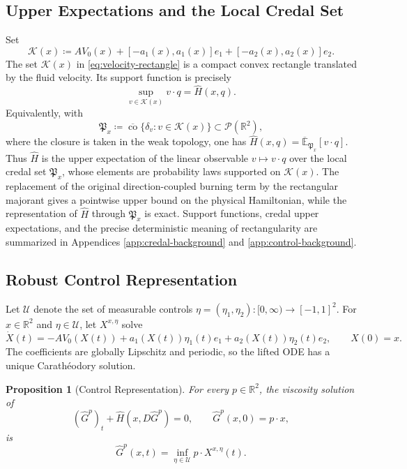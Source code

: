 \documentclass[11pt,reqno,noamsfonts]{amsart}
\newtheorem{proposition}[theorem]{Proposition}
\theoremstyle{definition}
\theoremstyle{remark}
\newcommand{\R}{\mathbb R}
\newcommand{\Pp}{\mathcal P}
\newcommand{\clco}{\overline{\operatorname{co}}}
\newcommand{\Hhat}{\widehat H}
\newcommand{\upperE}{\overline{\mathbb E}}
\begin{document}
\subsection{Upper Expectations and the Local Credal Set}
Set
\begin{equation}\label{eq:velocity-rectangle}
  \mathcal K(x)
  \coloneqq A V_0(x)
   +[-a_1(x),a_1(x)]e_1
   +[-a_2(x),a_2(x)]e_2.
\end{equation}
The set $\mathcal K(x)$ in \eqref{eq:velocity-rectangle} is a compact
convex rectangle translated by the fluid velocity.  Its support function is precisely
\[
  \sup_{v\in\mathcal K(x)}v\cdot q=\Hhat(x,q).
\]
Equivalently, with
\[
  \mathfrak P_x
  \coloneqq \clco\{\delta_v:v\in\mathcal K(x)\}
  \subset\Pp(\R^2),
\]
where the closure is taken in the weak topology, one has
  $\Hhat(x,q)
  =\upperE_{\mathfrak P_x}[v\cdot q]$.
Thus $\Hhat$ is the upper expectation of the linear observable
$v\mapsto v\cdot q$ over the local credal set $\mathfrak P_x$, whose
elements are probability laws supported on $\mathcal K(x)$. The replacement of the original direction-coupled burning term by the
rectangular majorant gives a pointwise upper bound on the physical
Hamiltonian, while the representation of $\Hhat$ through
$\mathfrak P_x$ is exact. Support functions, credal upper expectations, and the precise
deterministic meaning of rectangularity are summarized in
Appendices \ref{app:credal-background} and \ref{app:control-background}.



\subsection{Robust Control Representation}
Let $\mathcal U$ denote the set of measurable controls $\eta=(\eta_1,\eta_2):[0,\infty)\to[-1,1]^2$.  For $x\in\R^2$ and $\eta\in\mathcal U$, let $X^{x,\eta}$ solve
\begin{equation}\label{eq:majorant-dynamics}
  \dot X(t)
  =-A V_0(X(t))
   +a_1(X(t))\eta_1(t)e_1
   +a_2(X(t))\eta_2(t)e_2,
  \qquad
  X(0)=x.
\end{equation}
The coefficients are globally Lipschitz and periodic, so the lifted ODE has a unique Carath\'eodory solution.

\begin{proposition}[Control Representation]
\label{prop:control-representation}
For every $p\in\mathbb R^2$, the viscosity solution of
\[
  (\widehat G^p)_t+\Hhat(x,D\widehat G^p)=0,
  \qquad
  \widehat G^p(x,0)=p\cdot x,
\]
is
\begin{equation}\label{eq:value-representation}
  \widehat G^p(x,t)
  =
  \inf_{\eta\in\mathcal U}
  p\cdot X^{x,\eta}(t).
\end{equation}
\end{proposition}
\end{document}
